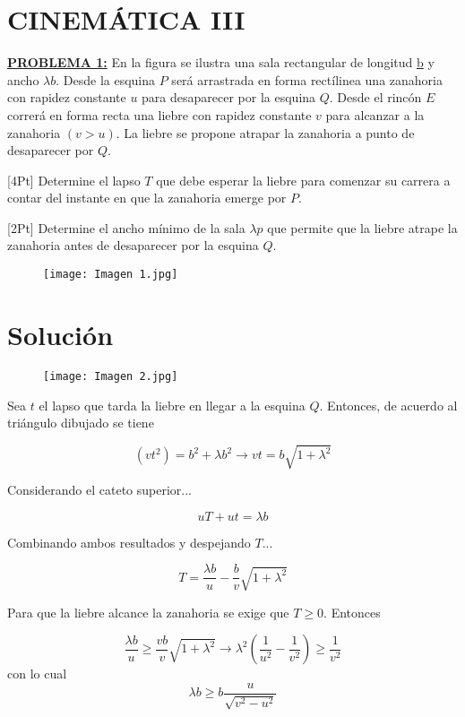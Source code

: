 \documentclass{article}
\begin{document}
\section{CINEMÁTICA III}
\underline{\textbf{PROBLEMA 1:}} En la figura se ilustra una sala rectangular de longitud \underline{b} y ancho \underline{$\lambda b$}. Desde la esquina $P$ será arrastrada en forma rectílinea una zanahoria con rapidez constante \underline{$u$} para desaparecer por la esquina $Q$. Desde el rincón $E$ correrá en forma recta una liebre con rapidez constante \underline{$v$} para alcanzar a la zanahoria $(v>u)$. La liebre se propone atrapar la zanahoria a punto de desaparecer por $Q$.

[4Pt] Determine el lapso $T$ que debe esperar la liebre para comenzar su carrera a contar del instante en que la zanahoria emerge por $P$.

[2Pt] Determine el ancho mínimo de la sala $\lambda p$ que permite que la liebre atrape la zanahoria antes de desaparecer por la esquina $Q$.

\begin{figure}[h!]
\centering
\texttt{[image: Imagen 1.jpg]}
\end{figure}

\section{Solución}

\begin{figure}[h!]
\centering
\texttt{[image: Imagen 2.jpg]}
\end{figure}

Sea $t$ el lapso que tarda la liebre en llegar a la esquina $Q$. Entonces, de acuerdo al triángulo dibujado se tiene

$$(vt^2)=b^{2}+\lambda b^{2} \rightarrow vt=b\sqrt{1+\lambda^{2}}$$

Considerando el cateto superior...

$$uT+ut=\lambda b$$

Combinando ambos resultados y despejando $T$...

$$T=\frac{\lambda b}{u}-\frac{b}{v}\sqrt{1+\lambda ^{2}}$$

Para que la liebre alcance la zanahoria se exige que $T\geq 0$. Entonces

$$\frac{\lambda b}{u}\geq \frac{vb}{v}\sqrt{1+\lambda^{2}}\rightarrow \lambda^{2}\left(\frac{1}{u^{2}}-\frac{1}{v^{2}}\right)\geq \frac{1}{v^{2}}$$
con lo cual
$$\lambda b \geq b \frac{u}{\sqrt{v^{2}-u^{2}}}$$
\end{document}
